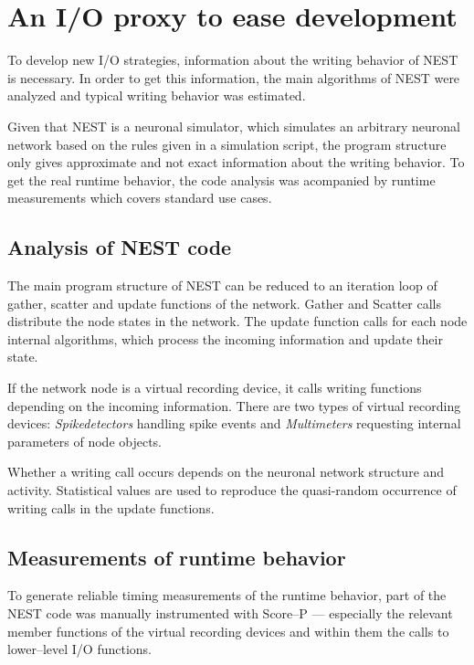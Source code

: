 \documentclass[]{YIC2015}
\begin{document}
\section{An I/O proxy to ease development}

To develop new I/O strategies, information about the writing behavior
of NEST is necessary. In order to get this information, the main
algorithms of NEST were analyzed and typical writing behavior was
estimated.

Given that NEST is a neuronal simulator, which simulates an arbitrary
neuronal network based on the rules given in a simulation script, the
program structure only gives approximate and not exact information
about the writing behavior. To get the real runtime behavior, the code
analysis was acompanied by runtime measurements which covers standard
use cases.

\subsection{Analysis of NEST code}


The main program structure of NEST can be reduced to an iteration loop
of gather, scatter and update functions of the network. Gather and
Scatter calls distribute the node states in the network. The update
function calls for each node internal algorithms, which process the
incoming information and update their state.

If the network node is a virtual recording device, it calls writing
functions depending on the incoming information. There are two types
of virtual recording devices: \emph{Spikedetectors} handling spike
events and \emph{Multimeters} requesting internal parameters of node
objects.

Whether a writing call occurs depends on the neuronal network
structure and activity. Statistical values are used to reproduce the
quasi-random occurrence of writing calls in the update functions.

\subsection{Measurements of runtime behavior}

To generate reliable timing measurements of the runtime behavior, part
of the NEST code was manually instrumented with Score--P \cite{ScoreP}
--- especially the relevant member functions of the virtual recording
devices and within them the calls to lower--level I/O functions.
\end{document}
